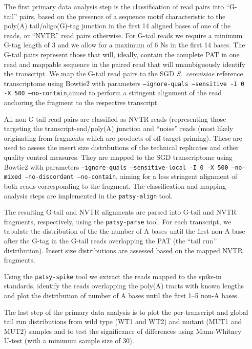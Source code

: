 \documentclass[10pt]{article}
\begin{document}
The first primary data analysis step is the classification of read pairs into ``G-tail'' pairs, based on the presence of a sequence motif characteristic to the poly(A) tail/oligo(G)-tag junction in the first 14 aligned bases of one of the reads, or ``NVTR'' read pairs otherwise. For G-tail reads we require a minimum G-tag length of 3 and we allow for a maximum of 6 Ns in the first 14 bases. The G-tail pairs represent those that will, ideally, contain the complete PAT in one read and mappable sequence in the paired read that will unambiguously identify the transcript. We map the G-tail read pairs to the SGD \textit{S.~cerevisiae} reference transcriptome \cite{engel13} using Bowtie2 \cite{langmead12} with parameters \texttt{--ignore-quals --sensitive -I 0 -X 500 –no-contain},aimed to perform a stringent alignment of the read anchoring the fragment to the respective transcript 

All non-G-tail read pairs are classified as NVTR reads (representing those targeting the transcript-end/poly(A) junction and ``noise'' reads (most likely originating from fragments which are products of off-target priming). These are used to assess the insert size distributions of the technical replicates and other quality control measures. They are mapped to the SGD transcriptome using Bowtie2 with parameters \texttt{--ignore-quals --sensitive-local -I 0 -X 500 --no-mixed --no-discordant –no-contain}, aiming for a less stringent alignment of both reads corresponding to the fragment. The classification and mapping analysis steps are implemented in the \texttt{patsy-align} tool. 

The resulting G-tail and NVTR alignments are parsed into G-tail and NVTR fragments, respectively, using the \texttt{patsy-parse} tool. For each transcript, we tabulate the distribution of the the number of A bases until the first non-A base after the G-tag in the G-tail reads overlapping the PAT (the ``tail run’’ distribution). Insert size distributions are assessed based on the mapped NVTR fragments.

Using the \texttt{patsy-spike} tool we extract the reads mapped to the spike-in standards, identify the reads overlapping the poly(A) tracts with known lengths and plot the distribution of number of A bases until the first 1--5 non-A bases.

The last step of the primary data analysis is to plot the per-transcript and global tail run distributions from wild type (WT1 and WT2) and mutant (MUT1 and MUT2) samples and to test the significance of differences using Mann-Whitney U-test (with a minimum sample size of 30).
\end{document}
